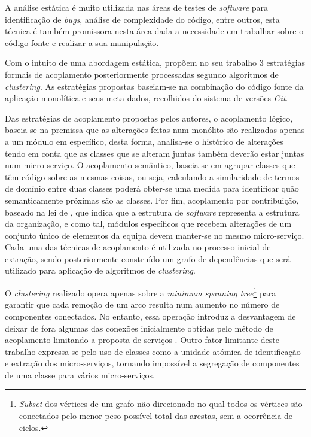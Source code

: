     A análise estática é muito utilizada nas áreas de testes de \textit{software} para identificação de \textit{bugs}, análise de complexidade do código, entre outros, esta técnica é também promissora nesta área dada a necessidade em trabalhar sobre o código fonte e realizar a sua manipulação.
    
    Com o intuito de uma abordagem estática, \cite{mazlami17} propõem no seu trabalho 3 estratégias formais de acoplamento posteriormente processadas segundo algoritmos de \textit{clustering}. As estratégias propostas baseiam-se na combinação do código fonte da aplicação monolítica e seus meta-dados, recolhidos do sistema de versões \textit{Git}. 
    
    Das estratégias de acoplamento propostas pelos autores, o acoplamento lógico, baseia-se na premissa que as alterações feitas num monólito são realizadas apenas a um módulo em específico, desta forma, analisa-se o histórico de alterações tendo em conta que as classes que se alteram juntas também deverão estar juntas num micro-serviço. O acoplamento semântico, baseia-se em agrupar classes que têm código sobre as mesmas coisas, ou seja, calculando a similaridade de termos de domínio entre duas classes poderá obter-se uma medida para identificar quão semanticamente próximas são as classes. Por fim, acoplamento por contribuição, baseado na lei de \cite{conwayslaw}, que indica que a estrutura de \textit{software} representa a estrutura da organização, e como tal, módulos específicos que recebem alterações de um conjunto único de elementos da equipa devem manter-se no mesmo micro-serviço. Cada uma das técnicas de acoplamento é utilizada no processo inicial de extração, sendo posteriormente construído um grafo de dependências que será utilizado para aplicação de algoritmos de \textit{clustering}.
    
    O \textit{clustering} realizado opera apenas sobre a \textit{minimum spanning tree}\footnote{\textit{Subset} dos vértices de um grafo não direcionado no qual todos os vértices são conectados pelo menor peso possível total das arestas, sem a ocorrência de ciclos.} para garantir que cada remoção de um arco resulta num aumento no número de componentes conectados. No entanto, essa operação introduz a desvantagem de deixar de fora algumas das conexões inicialmente obtidas pelo método de acoplamento limitando a proposta de serviços \citep{mazlami17}. Outro fator limitante deste trabalho expressa-se pelo uso de classes como a unidade atómica de identificação e extração dos micro-serviços, tornando impossível a segregação de componentes de uma classe para vários micro-serviços.
    

